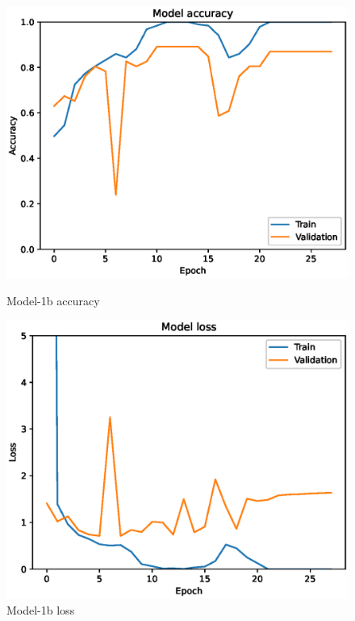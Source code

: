 \begin{figure}
    \centering
    \begin{minipage}{0.45\textwidth}
        \centering
        \includegraphics[width=\textwidth]{./fig/accuracy1b.eps}
        \caption{Model-1b accuracy}
        \label{fig:model1_acc}
    \end{minipage}
    \begin{minipage}{0.45\textwidth}
        \centering
        \includegraphics[width=\textwidth]{./fig/loss1b.eps}
        \caption{Model-1b loss}
        \label{fig:model1_loss}
    \end{minipage}
\end{figure}

